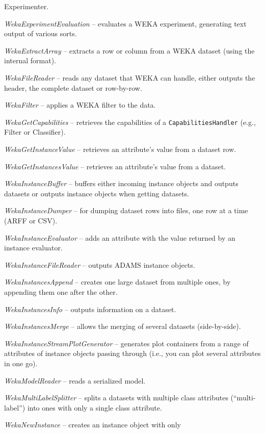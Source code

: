 \begin{tight_itemize}
	Experimenter.
	\item \textit{WekaExperimentEvaluation} -- evaluates a WEKA experiment,
	generating text output of various sorts.
	\item \textit{WekaExtractArray} -- extracts a row or column from a WEKA
	dataset (using the internal format).
	\item \textit{WekaFileReader} -- reads any dataset that WEKA can handle, 
	either outputs the header, the complete dataset or row-by-row.
	\item \textit{WekaFilter} -- applies a WEKA filter to the data.
	\item \textit{WekaGetCapabilities} -- retrieves the capabilities of a
	\texttt{CapabilitiesHandler} (e.g., Filter or Classifier).
	\item \textit{WekaGetInstanceValue} -- retrieves an attribute's value from
	a dataset row.
	\item \textit{WekaGetInstancesValue} -- retrieves an attribute's value from
	a dataset.
	\item \textit{WekaInstanceBuffer} -- buffers either incoming instance 
	objects and outputs datasets or outputs instance objects when getting
	datasets.
	\item \textit{WekaInstanceDumper} -- for dumping dataset rows into files,
	one row at a time (ARFF or CSV).
	\item \textit{WekaInstanceEvaluator} -- adds an attribute with the value
	returned by an instance evaluator.
	\item \textit{WekaInstanceFileReader} -- outputs ADAMS instance objects.
	\item \textit{WekaInstancesAppend} -- creates one large dataset from 
	multiple ones, by appending them one after the other.
	\item \textit{WekaInstancesInfo} -- outputs information on a dataset.
	\item \textit{WekaInstancesMerge} -- allows the merging of several datasets 
	(side-by-side).
	\item \textit{WekaInstanceStreamPlotGenerator} -- generates plot containers
	from a range of attributes of instance objects passing through (i.e., you 
	can plot several attributes in one go).
	\item \textit{WekaModelReader} -- reads a serialized model.
	\item \textit{WekaMultiLabelSplitter} -- splits a datasets with multiple
	class attributes (``multi-label'') into ones with only a single class 
	attribute.
	\item \textit{WekaNewInstance} -- creates an instance object with only 

\end{tight_itemize}
